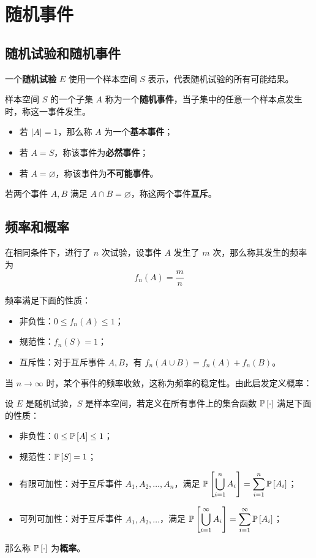 \section{随机事件}

\subsection{随机试验和随机事件}

一个\textbf{随机试验} $E$ 使用一个样本空间 $S$ 表示，代表随机试验的所有可能结果。

样本空间 $S$ 的一个子集 $A$ 称为一个\textbf{随机事件}，当子集中的任意一个样本点发生时，称这一事件发生。

\begin{itemize}
	\item 若 $|A| = 1$，那么称 $A$ 为一个\textbf{基本事件}；
	\item 若 $A = S$，称该事件为\textbf{必然事件}；
	\item 若 $A = \varnothing$，称该事件为\textbf{不可能事件}。
\end{itemize}

若两个事件 $A, B$ 满足 $A \cap B = \varnothing$，称这两个事件\textbf{互斥}。

\subsection{频率和概率}

在相同条件下，进行了 $n$ 次试验，设事件 $A$ 发生了 $m$ 次，那么称其发生的频率为
$$
f_n(A) = \frac{m}{n}
$$

频率满足下面的性质：

\begin{itemize}
	\item 非负性：$0 \le f_n(A) \le 1$；
	\item 规范性：$f_n(S) = 1$；
	\item 互斥性：对于互斥事件 $A, B$，有 $f_n(A \cup B) = f_n(A) + f_n(B)$。
\end{itemize}

当 $n \to \infty$ 时，某个事件的频率收敛，这称为频率的稳定性。由此启发定义概率：

\begin{definition}[概率]
	设 $E$ 是随机试验，$S$ 是样本空间，若定义在所有事件上的集合函数 $\operatorname{\mathbb{P}}\left[\cdot\right]$ 满足下面的性质：
	\begin{itemize}
		\item 非负性：$0 \le \operatorname{\mathbb{P}}\left[A\right] \le 1$；
		\item 规范性：$\operatorname{\mathbb{P}}\left[S\right] = 1$；
		\item 有限可加性：对于互斥事件 $A_1, A_2, \dots, A_n$，满足 $\displaystyle \operatorname{\mathbb{P}}\left[\bigcup_{i = 1}^{n} A_i\right] = \sum_{i = 1}^{n} \operatorname{\mathbb{P}}\left[A_i\right]$；
		\item 可列可加性：对于互斥事件 $A_1, A_2, \dots$，满足 $\displaystyle \operatorname{\mathbb{P}}\left[\bigcup_{i = 1}^{\infty} A_i\right] = \sum_{i = 1}^{\infty} \operatorname{\mathbb{P}}\left[A_i\right]$；
	\end{itemize}
	那么称 $\operatorname{\mathbb{P}}\left[\cdot\right]$ 为\textbf{概率}。
\end{definition}

